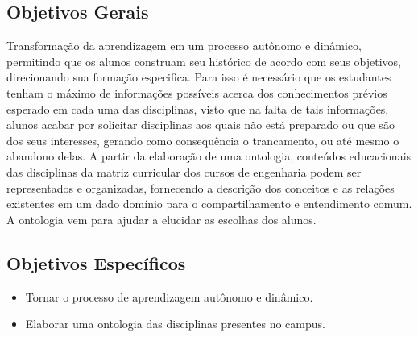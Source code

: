 
\subsection{Objetivos Gerais}

Transformação da aprendizagem em um processo autônomo e dinâmico, permitindo que os alunos construam seu histórico de acordo com seus objetivos, direcionando sua formação especifica. Para isso é necessário que os estudantes tenham o máximo de informações possíveis acerca dos conhecimentos prévios esperado em cada uma das disciplinas, visto que na falta de tais informações, alunos acabar por solicitar disciplinas aos quais não está preparado ou que são dos seus interesses, gerando como consequência o trancamento, ou até mesmo o abandono delas. A partir da elaboração de uma ontologia, conteúdos educacionais das disciplinas da matriz curricular dos cursos de engenharia podem ser representados e organizadas, fornecendo a descrição dos conceitos e as relações existentes em um dado domínio para o compartilhamento e entendimento comum. A ontologia vem para ajudar a elucidar as escolhas dos alunos.

\subsection{Objetivos Específicos}

	\begin{itemize}
		\item Tornar o processo de aprendizagem autônomo e dinâmico.

		\item Elaborar uma ontologia das disciplinas presentes no campus.
	\end{itemize}